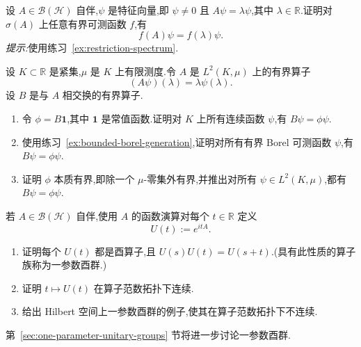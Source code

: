 \begin{exercise}[特征向量上的函数演算]\label{ex:functional-calculus-eigenvector}
设 \(A\in\mathcal{B}(\mathcal{H})\) 自伴,\(\psi\) 是特征向量,即 \(\psi\neq0\) 且 \(A\psi=\lambda\psi\),其中 \(\lambda\in\mathbb{R}\).证明对 \(\sigma(A)\) 上任意有界可测函数 \(f\),有
\[
f(A)\psi=f(\lambda)\psi.
\]
\emph{提示:}使用练习~\ref{ex:restriction-spectrum}.
\end{exercise}

\begin{exercise}[与乘法算子相交换的算子]\label{ex:commuting-multiplication-operator}
设 \(K\subset\mathbb{R}\) 是紧集,\(\mu\) 是 \(K\) 上有限测度.令 \(A\) 是 \(L^{2}(K,\mu)\) 上的有界算子
\[
(A\psi)(\lambda)=\lambda\psi(\lambda).
\]
设 \(B\) 是与 \(A\) 相交换的有界算子.
\begin{enumerate}[label=(\alph*)]
\item 令 \(\phi=B\mathbf{1}\),其中 \(\mathbf{1}\) 是常值函数.证明对 \(K\) 上所有连续函数 \(\psi\),有 \(B\psi=\phi\psi\).
\item 使用练习~\ref{ex:bounded-borel-generation},证明对所有有界 Borel 可测函数 \(\psi\),有 \(B\psi=\phi\psi\).
\item 证明 \(\phi\) 本质有界,即除一个 \(\mu\)-零集外有界,并推出对所有 \(\psi\in L^{2}(K,\mu)\),都有 \(B\psi=\phi\psi\).
\end{enumerate}
\end{exercise}

\begin{exercise}[一参数酉群]\label{ex:bounded-one-parameter-unitary-group}
若 \(A\in\mathcal{B}(\mathcal{H})\) 自伴,使用 \(A\) 的函数演算对每个 \(t\in\mathbb{R}\) 定义
\[
U(t):=e^{itA}.
\]
\begin{enumerate}[label=(\alph*)]
\item 证明每个 \(U(t)\) 都是酉算子,且 \(U(s)U(t)=U(s+t)\).(具有此性质的算子族称为一参数酉群.)
\item 证明 \(t\mapsto U(t)\) 在算子范数拓扑下连续.
\item 给出 Hilbert 空间上一参数酉群的例子,使其在算子范数拓扑下不连续.
\end{enumerate}
第~\ref{sec:one-parameter-unitary-groups} 节将进一步讨论一参数酉群.
\end{exercise}
